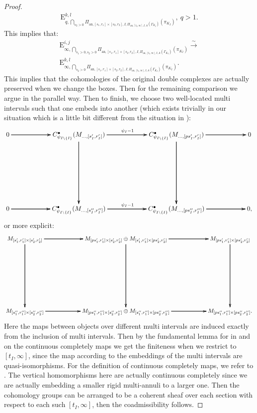 \documentclass[12pt]{amsart}
\theoremstyle{definition}
\numberwithin{equation}{section}
\begin{document}
\begin{proof}
\begin{align}
\mathrm{E}^{k,l}_{q,\bigcap_{s_2>0} \Pi_{\mathrm{an},[s_1,r_{1}]\times [s_2,r_{2}],I,\Pi_{\mathrm{an},[t_I,\infty],I,A}(\Gamma_{K_I})}(\pi_{K_I})},~q>1.
\end{align}
This implies that:
\begin{align}
\mathrm{E}^{i,j}_{\infty,\bigcap_{s_1>0,s_2>0} \Pi_{\mathrm{an},[s_1,r_{1}]\times [s_2,r_{2}],I,\Pi_{\mathrm{an},[t_I,\infty],I,A}(\Gamma_{K_I})}(\pi_{K_I})}\overset{\sim}{\longrightarrow}\\
\mathrm{E}^{k,l}_{\infty,\bigcap_{s_2>0} \Pi_{\mathrm{an},[s_1,r_{1}]\times [s_2,r_{2}],I,\Pi_{\mathrm{an},[t_I,\infty],I,A}(\Gamma_{K_I})}(\pi_{K_I})}.
\end{align}
This implies that the cohomologies of the original double complexes are actually preserved when we change the boxes. Then for the remaining comparison we argue in the parallel way.
Then to finish, we choose two well-located multi intervals such that one embeds into another (which exists trivially in our situation which is a little bit different from the situation in \cite{KL3}):
\[
\xymatrix@R+6pc@C+3pc{
 0\ar[r] \ar[r] \ar[r]  &C^\bullet_{\psi_{I\backslash \{I\}}}(M_{...,[s'_I,r'_I]}) \ar[r]^{\psi_I-1} \ar[r] \ar[r] \ar[d]\ar[d]\ar[d]  & C^\bullet_{\psi_{I\backslash \{I\}}}(M_{...,[ps'_I,r'_I]})\ar[r] \ar[r] \ar[r] \ar[d]\ar[d]\ar[d]  &0\\
 0\ar[r] \ar[r] \ar[r]  &C^\bullet_{\psi_{I\backslash \{I\}}}(M_{...,[s''_I,r''_I]}) \ar[r]^{\psi_I-1} \ar[r] \ar[r]  & C^\bullet_{\psi_{I\backslash \{I\}}}(M_{...,[ps''_I,r''_I]})\ar[r] \ar[r] \ar[r] &0
,}
\]
or more explicit:
\[
\xymatrix@R+7pc@C+3pc{
M_{[s'_1,r'_1]\times[s'_2,r'_2]}\ar[r] \ar[r] \ar[r] \ar[d] \ar[d] \ar[d] & M_{[ps'_1,r'_1]\times[s'_2,r'_2]}\oplus M_{[s'_1,r'_1]\times[ps'_2,r'_2]}\ar[r] \ar[r] \ar[r]\ar[d] \ar[d] \ar[d] & M_{[ps'_1,r'_1]\times[ps'_2,r'_2]} \ar[d]\ar[d]\ar[d] \\
M_{[s''_1,r''_1]\times[s''_2,r''_2]} \ar[r] \ar[r] \ar[r]  & M_{[ps''_1,r''_1]\times[s''_2,r''_2]}\oplus M_{[s''_1,r''_1]\times[ps''_2,r''_2]}  \ar[r] \ar[r] \ar[r] & M_{[ps''_1,r''_1]\times[ps''_2,r''_2]}.\\
}
\]
Here the maps between objects over different multi intervals are induced exactly from the  inclusion of multi intervals. Then by the fundamental lemma for in \cite[Satz 5.2]{Kie1} and \cite[Lemma 1.10]{KL3} on the continuous completely maps  we get the finiteness when we restrict to $[t_I,\infty]$, since the map according to the embeddings of the multi intervals are quasi-isomorphisms. For the definition of continuous completely maps, we refer to \cite[Definition 1.3]{KL3}. The vertical homomorphisms here are actually continuous completely since we are actually embedding a smaller rigid multi-annuli to a larger one. Then the cohomology groups can be arranged to be a coherent sheaf over each section with respect to each such $[t_I,\infty]$, then the coadmissibility follows.
\end{proof}
\end{document}
